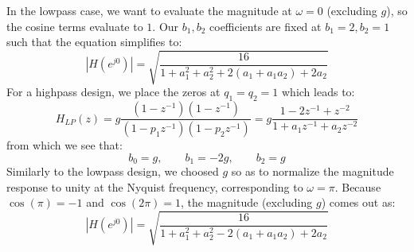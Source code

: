 In the lowpass case, we want to evaluate the magnitude at $\omega=0$ (excluding $g$), so the cosine terms evaluate to $1$. Our $b_1, b_2$ coefficients are fixed at $b_1=2, b_2=1$ such that the equation simplifies to:
\begin{equation}
 |H(e^{j 0})| 
 = \sqrt{\frac{16}{1 + a_1^2 + a_2^2 + 2 (a_1 + a_1 a_2)  + 2 a_2  } }
\end{equation}
For a highpass design, we place the zeros at $q_1 = q_2 = 1$ which leads to:
\begin{equation}
 H_{LP}(z) = g \frac{(1 - z^{-1})(1 - z^{-1})} {(1 - p_1 z^{-1})(1 - p_2 z^{-1}) }
           = g \frac{1 - 2 z^{-1} + z^{-2}}    {1 + a_1 z^{-1} + a_2 z^{-2}      }
\end{equation}
from which we see that:
\begin{equation}
 b_0 = g, \qquad b_1 = -2 g, \qquad b_2 = g
\end{equation}
Similarly to the lowpass design, we choosed $g$ so as to normalize the magnitude response to unity at the Nyquist frequency, corresponding to $\omega = \pi$. Because $\cos(\pi) = -1$ and $\cos(2 \pi) = 1$, the magnitude (excluding $g$) comes out as:
\begin{equation}
 |H(e^{j 0})| 
 = \sqrt{\frac{16}{1 + a_1^2 + a_2^2 - 2 (a_1 + a_1 a_2)  + 2 a_2  } }
\end{equation}











